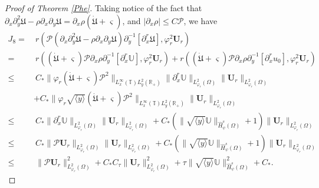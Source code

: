 \documentclass{amsart}
\numberwithin{equation}{section}
\newcommand\y{{{\langle y \rangle}}}
\begin{document}
\begin{proof}[Proof of Theorem \ref{Phe}]
Taking notice of the fact that $\partial_{x}\partial_{y}^{2}\mathfrak{U}-\rho\partial_{x}\partial_{y}\mathfrak{U}=\partial_{x}\rho(\dot{\mathfrak{U}}+\varsigma)$,
and $|\partial_{x}\rho|\leq C\mathcal{P}$, we have
\begin{align*}
J_{8}
=&~r\left(\mathcal{P}\left(\partial_{x}\partial_{y}^{2}\mathfrak{U}-\rho\partial_{x}\partial_{y}\mathfrak{U}\right)\partial_{y}^{-1}[\partial_{x}^{r}\mathfrak{U}],\varphi_{r}^{2}\mathbf{U}_{r}\right)\\
=&~r\left((\dot{\mathfrak{U}}+\varsigma)\mathcal{P}\partial_{x}\rho\partial_{y}^{-1}[\partial_{x}^{r}\mathbb{U}],\varphi_{r}^{2}\mathbf{U}_{r}\right)
  +r\left((\dot{\mathfrak{U}}+\varsigma)\mathcal{P}\partial_{x}\rho\partial_{y}^{-1}[\partial_{x}^{r}u_{0}],\varphi_{r}^{2}\mathbf{U}_{r}\right)\\
\leq&~C_{*}\|\varphi_{r}(\dot{\mathfrak{U}}+\varsigma)\mathcal{P}^{2}\|_{L_{x}^{\infty}(\mathbb{T})L_{y}^{2}(\mathbb{R_{+}})}
       \|\partial_{x}^{r}\mathbb{U}\|_{L_{\varphi_{r}}^{2}(\Omega)}\|\mathbf{U}_{r}\|_{L_{\varphi_{r}}^{2}(\Omega)}\\
    &+C_{*}\|\varphi_{r}\sqrt{\y}(\dot{\mathfrak{U}}+\varsigma)\mathcal{P}^{2}\|_{L_{x}^{\infty}(\mathbb{T})L_{y}^{2}(\mathbb{R_{+}})}
           \|\mathbf{U}_{r}\|_{L_{\varphi_{r}}^{2}(\Omega)}\\
\leq&~C_{*}\|\partial_{x}^{r}\mathbb{U}\|_{L_{\varphi_{r}}^{2}(\Omega)}\|\mathbf{U}_{r}\|_{L_{\varphi_{r}}^{2}(\Omega)}
     +C_{*}\left(\|\sqrt{\y}\mathbb{U}\|_{\hat{H}_{\psi}^{s}(\Omega)}+1\right)\|\mathbf{U}_{r}\|_{L_{\varphi_{r}}^{2}(\Omega)}\\
\leq&~C_{*}\|\mathcal{P}\mathbf{U}_{r}\|_{L_{\varphi_{r}}^{2}(\Omega)}\|\mathbf{U}_{r}\|_{L_{\varphi_{r}}^{2}(\Omega)}
     +C_{*}\left(\|\sqrt{\y}\mathbb{U}\|_{\hat{H}_{\psi}^{s}(\Omega)}+1\right)\|\mathbf{U}_{r}\|_{L_{\varphi_{r}}^{2}(\Omega)}\\
\leq&~\|\mathcal{P}\mathbf{U}_{r}\|_{L_{\varphi_{r}}^{2}(\Omega)}^{2}
     +C_{*}C_{\tau}\|\mathbf{U}_{r}\|_{L_{\varphi_{r}}^{2}(\Omega)}^{2}
     +\tau\|\sqrt{\y}\mathbb{U}\|_{\hat{H}_{\psi}^{s}(\Omega)}^{2}
     +C_{*}.
\end{align*}


\end{proof}
\end{document}
